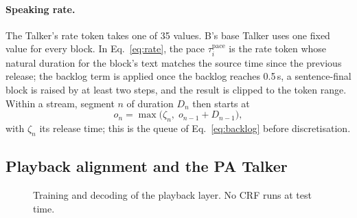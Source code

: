 \paragraph{Speaking rate.} The Talker's rate token takes one of 35 values. B's base Talker uses one fixed value for
every block. In Eq.~\eqref{eq:rate}, the pace $\tau^{\mathrm{pace}}_i$ is the rate token whose natural duration for the
block's text matches the source time since the previous release; the backlog term is applied once the backlog reaches
0.5\,s, a sentence-final block is raised by at least two steps, and the result is clipped to the token range. Within a
stream, segment $n$ of duration $D_n$ then starts at
\begin{equation}
o_n=\max\big(\zeta_n,\;o_{n-1}+D_{n-1}\big),
\label{eq:layout}
\end{equation}
with $\zeta_n$ its release time; this is the queue of Eq.~\eqref{eq:backlog} before discretisation.

\subsection{Playback alignment and the PA Talker}
\label{app:plem}
\label{app:train-pa}

\begin{figure}[h]
\small
{}
\caption{Training and decoding of the playback layer. No CRF runs at test time.}
\label{alg:pa}
\end{figure}

